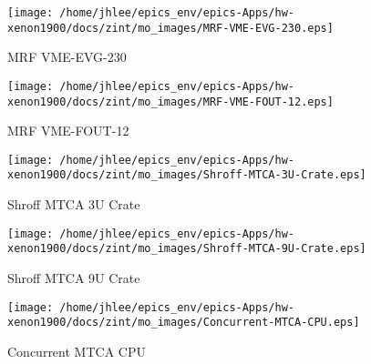 \noindent
\vspace{1.4cm}
\begin{minipage}{.2\textwidth}
\begin{center}
\texttt{[image: /home/jhlee/epics\_env/epics-Apps/hw-xenon1900/docs/zint/mo\_images/MRF-VME-EVG-230.eps]}
\end{center}
\end{minipage}
\begin{minipage}{.7\textwidth}
MRF VME-EVG-230
\end{minipage}


\noindent
\vspace{1.4cm}
\begin{minipage}{.2\textwidth}
\begin{center}
\texttt{[image: /home/jhlee/epics\_env/epics-Apps/hw-xenon1900/docs/zint/mo\_images/MRF-VME-FOUT-12.eps]}
\end{center}
\end{minipage}
\begin{minipage}{.7\textwidth}
MRF VME-FOUT-12
\end{minipage}


\noindent
\vspace{1.4cm}
\begin{minipage}{.2\textwidth}
\begin{center}
\texttt{[image: /home/jhlee/epics\_env/epics-Apps/hw-xenon1900/docs/zint/mo\_images/Shroff-MTCA-3U-Crate.eps]}
\end{center}
\end{minipage}
\begin{minipage}{.7\textwidth}
Shroff MTCA 3U Crate
\end{minipage}


\noindent
\vspace{1.4cm}
\begin{minipage}{.2\textwidth}
\begin{center}
\texttt{[image: /home/jhlee/epics\_env/epics-Apps/hw-xenon1900/docs/zint/mo\_images/Shroff-MTCA-9U-Crate.eps]}
\end{center}
\end{minipage}
\begin{minipage}{.7\textwidth}
Shroff MTCA 9U Crate
\end{minipage}


\noindent
\vspace{1.4cm}
\begin{minipage}{.2\textwidth}
\begin{center}
\texttt{[image: /home/jhlee/epics\_env/epics-Apps/hw-xenon1900/docs/zint/mo\_images/Concurrent-MTCA-CPU.eps]}
\end{center}
\end{minipage}
\begin{minipage}{.7\textwidth}
Concurrent MTCA CPU
\end{minipage}


